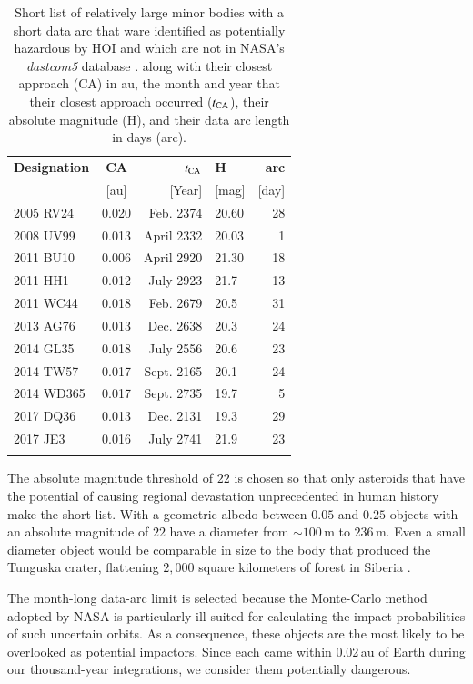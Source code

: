 \documentclass{aa}
\begin{document}
\begin{table}[]
\begin{tabular}{lcrlr}
\hline \hline
\bf{Designation} & \bf{CA} & \bf{$t_{\rm CA}$} & \bf{H} & \bf{arc} \\
                 & [au]    & [Year] & [mag] & [day] \\
\hline 
2005 RV24 & 0.020 &  Feb. 2374 & 20.60 & 28 \\
2008 UV99 & 0.013 &  April 2332 & 20.03 & 1 \\
2011 BU10 & 0.006 &  April 2920 & 21.30 & 18 \\ 
2011 HH1 & 0.012 &  July 2923 & 21.7 & 13 \\ 
2011 WC44 & 0.018 & Feb. 2679 & 20.5 & 31 \\ 
2013 AG76 & 0.013 &  Dec. 2638 & 20.3 & 24 \\ 
2014 GL35 & 0.018 & July 2556 & 20.6 & 23 \\ 
2014 TW57 & 0.017 & Sept. 2165 & 20.1 & 24 \\ 
2014 WD365 & 0.017 & Sept. 2735 & 19.7 & 5 \\
2017 DQ36 & 0.013 &  Dec. 2131 & 19.3 & 29 \\ 
2017 JE3 & 0.016 & July 2741 & 21.9 & 23 \\
\hline \hline
\vspace{0.5cm}
\end{tabular}
\caption{\label{TAB:Short_List} Short list of relatively large minor
  bodies with a short data arc that ware identified as potentially
  hazardous by HOI and which are not in NASA's \textit{dastcom5}
  database \citep{dastcom5}.  along with their closest approach (CA)
  in au, the month and year that their closest approach occurred
  ($t_{\rm CA}$), their absolute magnitude (H), and their data arc
  length in days (arc).}
\end{table}

The absolute magnitude threshold of $22$ is chosen so that only
asteroids that have the potential of causing regional devastation
unprecedented in human history make the short-list.  With a geometric
albedo between $0.05$ and $0.25$ objects with an absolute magnitude of
$22$ have a diameter from $\sim 100$\,m to $236$\,m. Even a small
diameter object would be comparable in size to the body that produced
the Tunguska crater, flattening $2,000$ square kilometers of forest in
Siberia \citep{Tunguska}.
 
The month-long data-arc limit is selected because the Monte-Carlo
method adopted by NASA is particularly ill-suited for calculating the
impact probabilities of such uncertain orbits.  As a consequence,
these objects are the most likely to be overlooked as potential
impactors. Since each came within 0.02\,au of Earth during our
thousand-year integrations, we consider them potentially dangerous.
\end{document}
